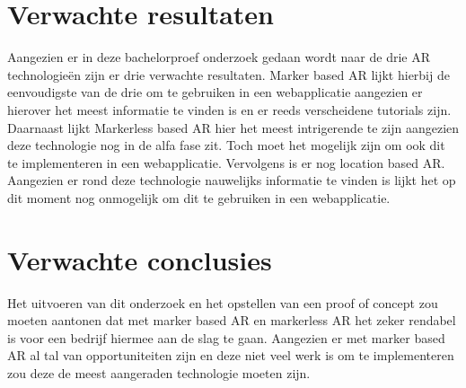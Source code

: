 \section{Verwachte resultaten}
\label{sec:verwachte_resultaten}

Aangezien er in deze bachelorproef onderzoek gedaan wordt naar de drie AR technologieën zijn er drie verwachte resultaten. Marker based AR lijkt hierbij de eenvoudigste van de drie om te gebruiken in een webapplicatie aangezien er hierover het meest informatie te vinden is en er reeds verscheidene tutorials zijn. Daarnaast lijkt Markerless based AR hier het meest intrigerende te zijn aangezien deze technologie nog in de alfa fase zit. Toch moet het mogelijk zijn om ook dit te implementeren in een webapplicatie. Vervolgens is er nog location based AR. Aangezien er rond deze technologie nauwelijks informatie te vinden is lijkt het op dit moment nog onmogelijk om dit te gebruiken in een webapplicatie. 

\section{Verwachte conclusies}
\label{sec:verwachte_conclusies}

Het uitvoeren van dit onderzoek en het opstellen van een proof of concept zou moeten aantonen dat met marker based AR en markerless AR het zeker rendabel is voor een bedrijf hiermee aan de slag te gaan. Aangezien er met marker based AR al tal van opportuniteiten zijn en deze niet veel werk is om te implementeren zou deze de meest aangeraden technologie moeten zijn. 


